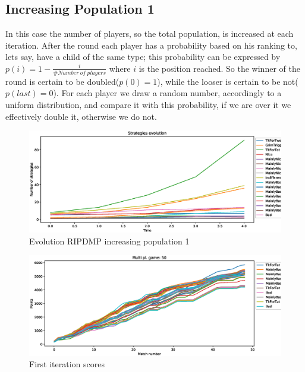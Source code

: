 \documentclass[journal,a4paper,10pt,twoside]{IEEEtran} %
\begin{document}
\subsection{Increasing Population 1}
In this case the number of players, so the total population, is increased at each iteration. After the round each player has a probability based on his ranking to, lets say, have a child of the same type; this probability can be expressed by $p(i)=1-\frac{i}{\#Number\ of\ players}$ where $i$ is the position reached. So the winner of the round is certain to be doubled($p(0)=1$), while the looser is certain to be not($p(last)=0$).
For each player we draw a random number, accordingly to a uniform distribution, and compare it with this probability, if we are over it we effectively double it, otherwise we do not.

\begin{figure}[!ht]
    \centering
    \includegraphics[width=1\columnwidth]{../img/ripdmp-incr/ripdmp-evolution-increasing-pop-50}
    \caption{Evolution RIPDMP increasing population 1}
    \label{fig:incrR}
\end{figure}

\begin{figure}[!ht]
    \centering
    \includegraphics[width=1\columnwidth]{../img/ripdmp-incr/ripdmp-scores-increasing-pop-50-r0}
    \caption{First iteration scores}
    \label{fig:incrFI}
\end{figure}
\end{document}
